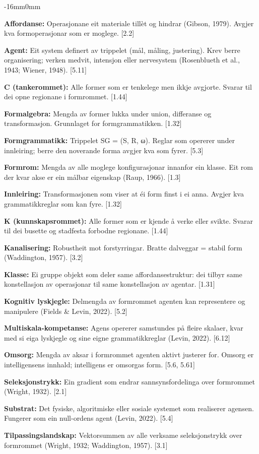 \documentclass[10pt,oneside]{book}
\newcommand{\msym}[1]{{\mathfbfont #1}}
\newcommand{\silentchapter}[2]{%
  \clearpage
  \markboth{#2}{}%
  \addcontentsline{toc}{chapter}{#1}%
}
\newenvironment{ordliste}{%
  \begingroup\small\setlength{\parskip}{2pt plus 0.6pt}%
  \linespread{0.97}\selectfont
}{%
  \endgroup
}
\newcommand{\ordlisteentry}[2]{%
  \par\addvspace{2.5pt}%
  \noindent\textbf{#1:} #2\par%
}
\newenvironment{widebody}{%
  \begin{adjustwidth}{-16mm}{0mm}%
}{%
  \end{adjustwidth}%
}
\begin{document}
\silentchapter{Ordliste}{ordliste}
\begin{widebody}
\begin{ordliste}
\ordlisteentry{Affordanse}{Operasjonane eit materiale tillèt og hindrar (Gibson, 1979). Avgjer kva formoperasjonar som er moglege. [2.2]}
\ordlisteentry{Agent}{Eit system definert av trippelet (mål, måling, justering). Krev berre organisering; verken medvit, intensjon eller nervesystem (Rosenblueth et al., 1943; Wiener, 1948). [5.11]}
\ordlisteentry{C (tankerommet)}{Alle former som er tenkelege men ikkje avgjorte. Svarar til dei opne regionane i formrommet. [1.44]}
\ordlisteentry{Formalgebra}{Mengda av former lukka under union, differanse og transformasjon. Grunnlaget for formgrammatikken. [1.32]}
\ordlisteentry{Formgrammatikk}{Trippelet SG = (S, R, \msym{ω}). Reglar som opererer under innleiring; berre den noverande forma avgjer kva som fyrer. [5.3]}
\ordlisteentry{Formrom}{Mengda av alle moglege konfigurasjonar innanfor ein klasse. Eit rom der kvar akse er ein målbar eigenskap (Raup, 1966). [1.3]}
\ordlisteentry{Innleiring}{Transformasjonen som viser at éi form finst i ei anna. Avgjer kva grammatikkreglar som kan fyre. [1.32]}
\ordlisteentry{K (kunnskapsrommet)}{Alle former som er kjende å verke eller svikte. Svarar til dei busette og stadfesta forbodne regionane. [1.44]}
\ordlisteentry{Kanalisering}{Robustheit mot forstyrringar. Bratte dalveggar = stabil form (Waddington, 1957). [3.2]}
\ordlisteentry{Klasse}{Ei gruppe objekt som deler same affordansestruktur: dei tilbyr same konstellasjon av operasjonar til same konstellasjon av agentar. [1.31]}
\ordlisteentry{Kognitiv lyskjegle}{Delmengda av formrommet agenten kan representere og manipulere (Fields \& Levin, 2022). [5.2]}
\ordlisteentry{Multiskala-kompetanse}{Agens opererer samstundes på fleire skalaer, kvar med si eiga lyskjegle og sine eigne grammatikkreglar (Levin, 2022). [6.12]}
\ordlisteentry{Omsorg}{Mengda av aksar i formrommet agenten aktivt justerer for. Omsorg er intelligensens innhald; intelligens er omsorgas form. [5.6, 5.61]}
\ordlisteentry{Seleksjonstrykk}{Ein gradient som endrar sannsynsfordelinga over formrommet (Wright, 1932). [2.1]}
\ordlisteentry{Substrat}{Det fysiske, algoritmiske eller sosiale systemet som realiserer agensen. Fungerer som ein null-ordens agent (Levin, 2022). [5.4]}
\ordlisteentry{Tilpassingslandskap}{Vektorsummen av alle verksame seleksjonstrykk over formrommet (Wright, 1932; Waddington, 1957). [3.1]}
\end{ordliste}
\end{widebody}
\end{document}
